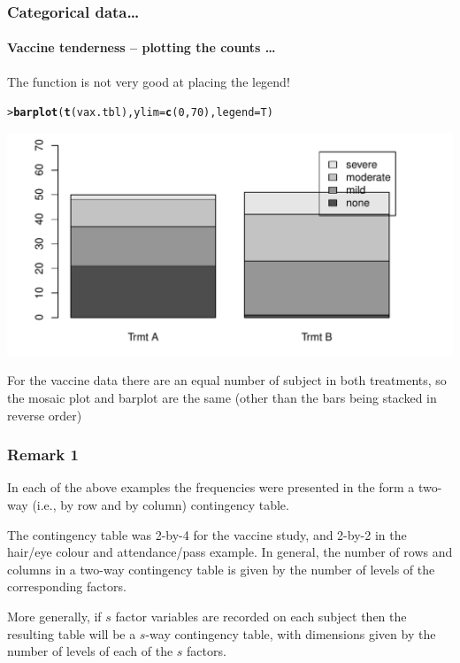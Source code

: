 \documentclass{beamer}\usepackage[]{graphicx}\usepackage[]{xcolor}
\makeatletter
\def\maxwidth{ %
  \ifdim\Gin@nat@width>\linewidth
    \linewidth
  \else
    \Gin@nat@width
  \fi
}
\newcommand{\hlnum}[1]{\textcolor[rgb]{0.686,0.059,0.569}{#1}}%
\newcommand{\hlstd}[1]{\textcolor[rgb]{0.345,0.345,0.345}{#1}}%
\newcommand{\hlkwc}[1]{\textcolor[rgb]{0.333,0.667,0.333}{#1}}%
\newcommand{\hlkwd}[1]{\textcolor[rgb]{0.737,0.353,0.396}{\textbf{#1}}}%
\newenvironment{kframe}{%
 \def\at@end@of@kframe{}%
 \ifinner\ifhmode%
  \def\at@end@of@kframe{\end{minipage}}%
  \begin{minipage}{\columnwidth}%
 \fi\fi%
 \def\FrameCommand##1{\hskip\@totalleftmargin \hskip-\fboxsep
 \colorbox{shadecolor}{##1}\hskip-\fboxsep
     \hskip-\linewidth \hskip-\@totalleftmargin \hskip\columnwidth}%
 \MakeFramed {\advance\hsize-\width
   \@totalleftmargin\z@ \linewidth\hsize
   \@setminipage}}%
 {\par\unskip\endMakeFramed%
 \at@end@of@kframe}
\newenvironment{knitrout}{}{} %
\makeatother
\begin{document}
\begin{frame}[fragile]
\frametitle{Categorical data\ldots}
\framesubtitle{Vaccine tenderness -- plotting the counts \ldots}
The  function is not very good at placing the legend!
\medskip

\begin{knitrout}\scriptsize
{}\color{fgcolor}\begin{kframe}
\begin{alltt}
\hlstd{> }\hlkwd{barplot}\hlstd{(}\hlkwd{t}\hlstd{(vax.tbl),}\hlkwc{ylim}\hlstd{=}\hlkwd{c}\hlstd{(}\hlnum{0}\hlstd{,}\hlnum{70}\hlstd{),}\hlkwc{legend}\hlstd{=T)}
\end{alltt}
\end{kframe}
\includegraphics[width=\maxwidth]{figure/RC-H16-002e-1} 
\end{knitrout}

For the vaccine data there are an equal number of subject in both treatments, so the mosaic plot and barplot are the same (other than the bars being stacked in reverse order)
\end{frame}




\begin{frame}[fragile]
\frametitle{Remark 1}
In each of the above examples the frequencies were presented in the form a two-way (i.e., by row and by column) contingency table.
\bigskip

The contingency table was 2-by-4 for the vaccine study, and 2-by-2 in the hair/eye colour and attendance/pass example. In general, the number of rows and columns in a two-way contingency table is given by the number of levels of the corresponding factors.
\bigskip

More generally, if $s$ factor variables are recorded on each subject then the resulting table will be a $s$-way contingency table, with dimensions given by the number of levels of each of the $s$ factors.
\vfill
\end{frame}
\end{document}
